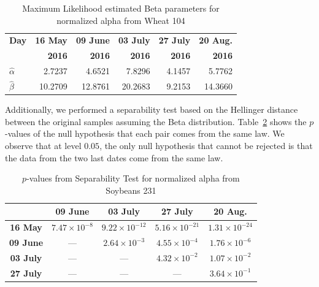 \documentclass[journal]{IEEEtran}
\begin{document}
\begin{table}[hbt]
  \centering
  \caption{Maximum Likelihood estimated Beta parameters for normalized alpha from Wheat 104}
  \label{tab:params_alpha_wt104}
  \begin{tabular}{lrrrrr}
    \toprule
    \textbf{Day} & \textbf{16 May} & \textbf{09 June} & \textbf{03 July} & \textbf{27 July} & \textbf{20 Aug.}\\ 
                 & \textbf{2016} & \textbf{2016} & \textbf{2016} & \textbf{2016} & \textbf{2016}\\\midrule
    \textbf{$\hat{\alpha}$} & 2.7237 & 4.6521 & 7.8296 & 4.1457 & 5.7762\\
    \textbf{$\hat{\beta}$} & 10.2709 & 12.8761 & 20.2683 & 9.2153 & 14.3660\\
    \bottomrule
  \end{tabular}
\end{table}

Additionally, we performed a separability test based on the Hellinger distance between the original samples assuming the Beta distribution.
Table~\ref{tab:pvalues_sep_alpha_sb231} shows the $p$-values of the null hypothesis that each pair comes from the same law.
We observe that at level $0.05$, the only null hypothesis that cannot be rejected is that the data from the two last dates come from the same law.

\begin{table}[hbt]
  \footnotesize
  \centering
  \caption{$p$-values from Separability Test for normalized alpha from Soybeans 231}
  \label{tab:pvalues_sep_alpha_sb231}
  \begin{tabular}{ccccc}
  \toprule
& \textbf{09 June} & \textbf{03 July} & \textbf{27 July} & \textbf{20 Aug.}\\ \midrule
  \textbf{16 May}  & $7.47 \times 10^{-8}$ & $9.22 \times 10^{-12}$ & $5.16 \times 10^{-21}$ & $1.31 \times 10^{-24}$ \\
  \textbf{09 June}  & --- & $2.64 \times 10^{-3}$ & $4.55 \times 10^{-4}$ & $1.76 \times 10^{-6}$ \\
  \textbf{03 July}  & --- & --- & $4.32 \times 10^{-2}$ & $1.07 \times 10^{-2}$\\
  \textbf{27 July}  & --- & --- & --- & $3.64 \times 10^{-1}$ \\
  \bottomrule
  \end{tabular}
\end{table}
\end{document}
